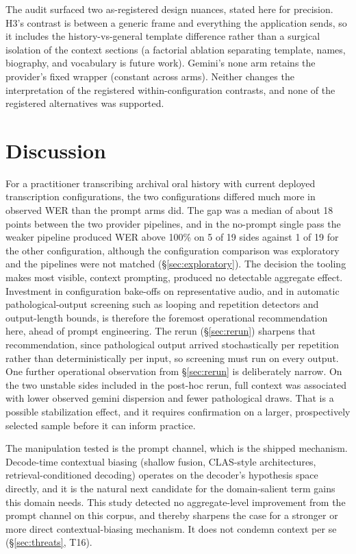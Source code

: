 \documentclass[11pt]{article}
\begin{document}
The audit surfaced two as-registered design nuances, stated here for precision. H3's contrast is between a generic frame and everything the application sends, so it includes the history-vs-general template difference rather than a surgical isolation of the context sections (a factorial ablation separating template, names, biography, and vocabulary is future work). Gemini's none arm retains the provider's fixed wrapper (constant across arms). Neither changes the interpretation of the registered within-configuration contrasts, and none of the registered alternatives was supported.

\section{Discussion}
\label{sec:discussion}

For a practitioner transcribing archival oral history with current deployed transcription configurations, the two configurations differed much more in observed WER than the prompt arms did. The gap was a median of about 18 points between the two provider pipelines, and in the no-prompt single pass the weaker pipeline produced WER above 100\% on 5 of 19 sides against 1 of 19 for the other configuration, although the configuration comparison was exploratory and the pipelines were not matched (\S\ref{sec:exploratory}). The decision the tooling makes most visible, context prompting, produced no detectable aggregate effect. Investment in configuration bake-offs on representative audio, and in automatic pathological-output screening such as looping and repetition detectors and output-length bounds, is therefore the foremost operational recommendation here, ahead of prompt engineering. The rerun (\S\ref{sec:rerun}) sharpens that recommendation, since pathological output arrived stochastically per repetition rather than deterministically per input, so screening must run on every output. One further operational observation from \S\ref{sec:rerun} is deliberately narrow. On the two unstable sides included in the post-hoc rerun, full context was associated with lower observed gemini dispersion and fewer pathological draws. That is a possible stabilization effect, and it requires confirmation on a larger, prospectively selected sample before it can inform practice.

The manipulation tested is the prompt channel, which is the shipped mechanism. Decode-time contextual biasing (shallow fusion, CLAS-style architectures, retrieval-conditioned decoding) operates on the decoder's hypothesis space directly, and it is the natural next candidate for the domain-salient term gains this domain needs. This study detected no aggregate-level improvement from the prompt channel on this corpus, and thereby sharpens the case for a stronger or more direct contextual-biasing mechanism. It does not condemn context per se (\S\ref{sec:threats}, T16).
\end{document}
